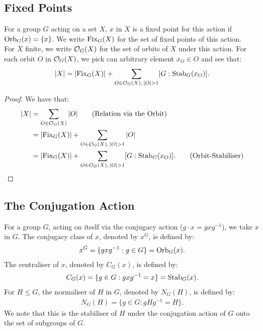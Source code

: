 \subsection{Fixed Points} \label{5.3}

For a group $G$ acting on a set $X$, $x$ in $X$ is a fixed point
for this action if $\operatorname{Orb}_G(x) = \{x\}$.
We write $\operatorname{Fix}_G(X)$ for the set of fixed points of this action. 
\\[\baselineskip]
For $X$ finite, we write $\mathcal{O}_G(X)$
for the set of orbits of $X$ under this action. For each orbit
$O$ in $\mathcal{O}_G(X)$, we pick can arbitrary element $x_O \in O$
and see that: \begin{align*}
    |X| = |\!\operatorname{Fix}_G(X)| + \sum_{O \in \mathcal{O}_G(X), \, |O| > 1} [G : \operatorname{Stab}_G(x_O)].
\end{align*}

\begin{proof}
    We have that: \begin{align*}
        |X| &= \sum_{O \in \mathcal{O}_G(X)} |O| \tag{Relation via the Orbit} \\
        &= |\!\operatorname{Fix}_G(X)| + \sum_{O \in \mathcal{O}_G(X), \, |O| > 1} |O| \\
        &= |\!\operatorname{Fix}_G(X)| + \sum_{O \in \mathcal{O}_G(X), \, |O| > 1} [G : \operatorname{Stab}_G(x_O)]. \tag{Orbit-Stabiliser}
    \end{align*}
\end{proof}

\subsection{The Conjugation Action}

For a group $G$, acting on itself via the conjugacy action 
($g \cdot x = gxg^{-1}$), we take $x$ in $G$. The conjugacy class 
of $x$, denoted by $x^G$, is defined by: \begin{align*}
    x^G = \{gxg^{-1} : g \in G\} = \operatorname{Orb}_G(x).
\end{align*} The centraliser of $x$, denoted by $C_G(x)$, 
is defined by: \begin{align*}
    C_G(x) = \{g \in G : gxg^{-1} = x\} = \operatorname{Stab}_G(x).
\end{align*} For $H \leq G$, the normaliser of $H$ in $G$,
denoted by $N_G(H)$, is defined by: \begin{align*}
    N_G(H) = \{g \in G : gHg^{-1} = H\}.
\end{align*} We note that this is the stabiliser of $H$ under the
conjugation action of $G$ onto the set of subgroups of $G$.


